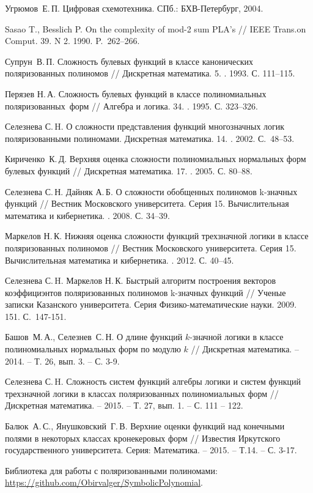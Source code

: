 \documentclass[bibliography=totoc, a4paper, 12pt]{extarticle}
\begin{document}
\begin{singlespace}
\begin{thebibliography}{0}
 Угрюмов~Е.\,П. Цифровая схемотехника. СПб.: БХВ-Петербург, 2004.

 Sasao T., Besslich P. On the complexity of mod-2 sum PLA’s  //
IEEE Trans.on Comput. 39. N 2. 1990. P.~262--266.

 Супрун~В.\,П. Сложность булевых функций в классе канонических
поляризованных полиномов // Дискретная математика. 5. . 1993. С.
111--115.

 Перязев Н.\,А. Сложность булевых функций в классе полиномиальных
поляризованных~форм // Алгебра и логика. 34. . 1995. С. 323--326.

 Селезнева С.\,H. О сложности представления функций многозначных
логик поляризованными полиномами. Дискретная математика. 14. .
2002. С.~48--53.

 Кириченко~К.\,Д. Верхняя оценка сложности полиномиальных
нормальных форм булевых функций // Дискретная математика. 17. .
2005. С. 80--88.

 Селезнева С.\,Н. Дайняк А.\,Б. О сложности обобщенных полиномов
k\nobreakdash-значных функций // Вестник Московского университета. Серия 15.
Вычислительная математика и кибернетика. . 2008. С. 34--39.

 Маркелов Н.\,К. Нижняя оценка сложности функций трехзначной
логики в классе поляризованных полиномов // Вестник Московского университета.
Серия 15. Вычислительная математика и кибернетика. . 2012. С.
40--45.

 Селезнева С.\,H. Маркелов Н.\,К. Быстрый алгоритм построения
векторов коэффициэнтов поляризованных полиномов k-значных функций // Ученые
записки Казанского университета. Серия Физико-математические науки. 2009. 151.
 С.~147-151.

 Башов~М.\,А., Селезнев~С.\,Н. О длине функций $k$-значной логики
в классе полиномиальных нормальных форм по модулю $k$ // Дискретная математика.
-- 2014. -- Т. 26, вып. 3. -- С. 3-9.

 Селезнева С.\,H. Сложность систем функций алгебры логики и систем
функций трехзначной логики в классах поляризованных полиномиальных форм //
Дискретная математика. -- 2015. -- Т. 27, вып. 1. -- С. 111 -- 122.

 Балюк~А.\,С., Янушковский~Г.\,В. Верхние оценки функций над
конечными полями в некоторых классах кронекеровых форм // Известия Иркутского
государственного университета. Серия: Математика. -- 2015. -- Т.14. -- С. 3-17.

 Библиотека для работы с поляризованными полиномами:
\url{https://github.com/Obirvalger/SymbolicPolynomial}.
\end{thebibliography}

\end{singlespace}
\end{document}
